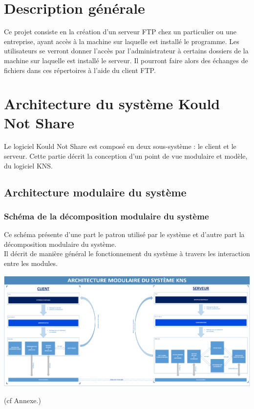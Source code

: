 \documentclass[10pt,a4paper]{report}
\begin{document}
\section{Description générale}

Ce projet consiste en la création d'un serveur FTP chez un particulier ou une entreprise, ayant accès à la machine sur laquelle est installé le programme. Les utilisateurs se verront donner l'accès par l'administrateur à certains dossiers de la machine sur laquelle est installé le serveur. Il pourront faire alors des échanges de fichiers dans ces répertoires à l'aide du client FTP.\\

\section{Architecture du système Kould Not Share}

		Le logiciel Kould Not Share est composé en deux sous-système : le client et le serveur. Cette partie décrit la conception d'un point de vue modulaire et modèle, du logiciel KNS.

	\subsection{Architecture modulaire du système}

		\subsubsection{Schéma de la décomposition modulaire du système}
			\begin{flushleft}
			Ce schéma présente d'une part le patron utilisé par le système et d'autre part la décomposition modulaire du système.\\
			Il décrit de manière général le fonctionnement du système à travers les interaction entre les modules.
			\end{flushleft}
			\begin{center}
				\includegraphics[scale=0.23]{Ressources/modules_KNS.png}
			\end{center}
		(cf Annexe.)
\end{document}
